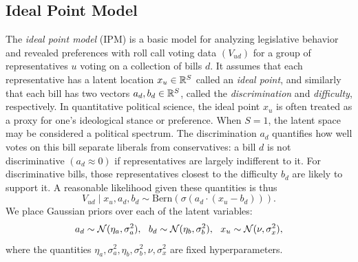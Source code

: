 \documentclass{article}
\begin{document}
\subsection{Ideal Point Model} 
The {\sl ideal point model} (IPM) \cite{Clinton2004} is a basic model for analyzing legislative behavior and revealed preferences with roll call voting data $(V_{ud})$ for a group of representatives $u$ voting on a collection of bills $d$. It assumes that each representative has a latent location $x_u\in\mathbb{R}^S$ called an {\sl ideal point}, and similarly that each bill has two vectors $a_d,b_d\in\mathbb{R}^S$, called the {\sl discrimination} and {\sl difficulty}, respectively. In quantitative political science, the ideal point $x_u$ is often treated as a proxy for one's ideological stance or preference. When $S=1$, the latent space may be considered a political spectrum. The discrimination $a_d$ quantifies how well votes on this bill separate liberals from conservatives: a bill $d$ is not discriminative $(a_d\approx 0)$ if representatives are largely indifferent to it. For discriminative bills, those representatives closest to the difficulty $b_d$ are likely to support it. A reasonable likelihood given these quantities is thus
\begin{equation}
V_{ud} \mid x_u, a_d, b_d \sim \text{Bern}(\sigma(a_d\cdot(x_u-b_d))).
\end{equation}
We place Gaussian priors over each of the latent variables:
\begin{equation}
a_d \sim \mathcal{N}(\eta_{a},\sigma^2_{a}), ~~
b_d \sim \mathcal{N}(\eta_{b},\sigma^2_{b}), ~~
x_u\sim \mathcal{N}(\nu,\sigma^2_x),
\end{equation}
where the quantities $\eta_{a},\sigma^2_{a},\eta_{b},\sigma^2_{b},\nu,\sigma^2_x$ are fixed hyperparameters.

\end{document}
